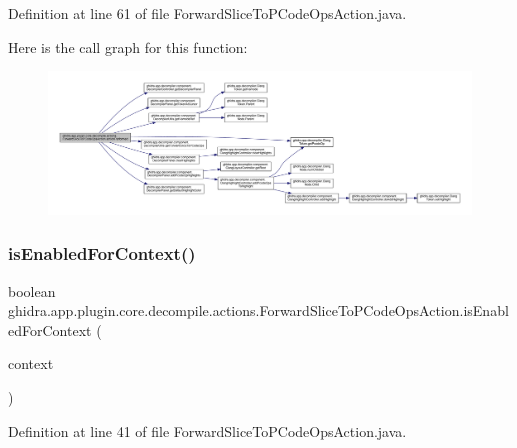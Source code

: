 Definition at line 61 of file Forward\+Slice\+To\+P\+Code\+Ops\+Action.\+java.

Here is the call graph for this function\+:
\nopagebreak
\begin{figure}[H]
\begin{center}
\leavevmode
\includegraphics[width=350pt]{classghidra_1_1app_1_1plugin_1_1core_1_1decompile_1_1actions_1_1_forward_slice_to_p_code_ops_action_ab96fb3bdfa2b676c3d2202539dc6a179_cgraph}
\end{center}
\end{figure}
\mbox{\label{classghidra_1_1app_1_1plugin_1_1core_1_1decompile_1_1actions_1_1_forward_slice_to_p_code_ops_action_a5613df436b98ac3fd0451ffa778fe692}} 
\subsubsection{\texorpdfstring{isEnabledForContext()}{isEnabledForContext()}}
{\footnotesize\ttfamily boolean ghidra.\+app.\+plugin.\+core.\+decompile.\+actions.\+Forward\+Slice\+To\+P\+Code\+Ops\+Action.\+is\+Enabled\+For\+Context (\begin{DoxyParamCaption}\item[{Action\+Context}]{context }\end{DoxyParamCaption})\hspace{0.3cm}{\ttfamily [inline]}}



Definition at line 41 of file Forward\+Slice\+To\+P\+Code\+Ops\+Action.\+java.


